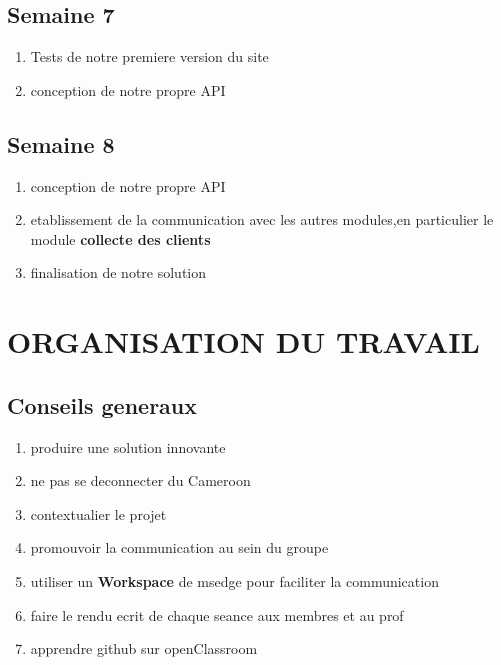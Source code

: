 \documentclass{article}
\begin{document}
\subsection{Semaine 7}
\begin{enumerate}
    \item Tests de notre premiere version du site
    \item conception de notre propre API
    
\end{enumerate}


\subsection{Semaine 8}
\begin{enumerate}
    \item conception de notre propre API 
    \item etablissement de la communication avec les autres modules,en particulier le module \textbf{collecte des clients}
    \item finalisation de notre solution
    
\end{enumerate}
\newpage
\section{ORGANISATION DU TRAVAIL}

\subsection{Conseils generaux}
\begin{enumerate}
    \item produire une solution innovante
    \item ne pas se deconnecter du Cameroon
    \item contextualier le projet
    \item promouvoir la communication au sein du groupe
 
    \item utiliser un \textbf{Workspace} de msedge pour faciliter la communication
    \item faire le rendu ecrit de chaque seance aux membres et au prof
    \item apprendre github sur openClassroom
\end{enumerate}
\end{document}

